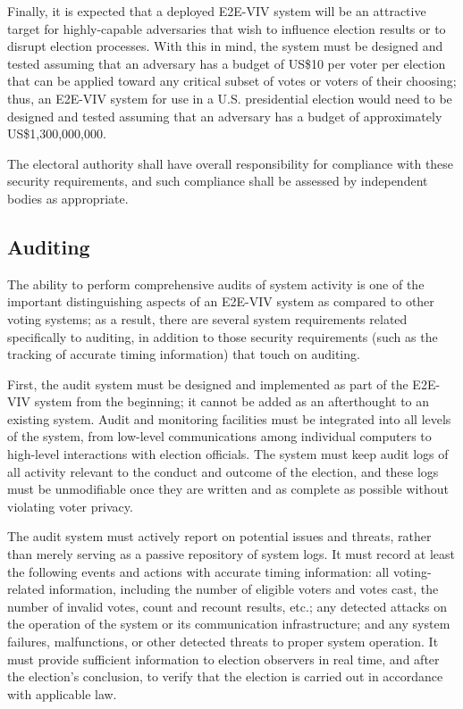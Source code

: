 Finally, it is expected that a deployed E2E-VIV system will be an
attractive target for highly-capable adversaries that wish to
influence election results or to disrupt election processes. With this
in mind, the system must be designed and tested assuming that an
adversary has a budget of US\$10 per voter per election that can be
applied toward any critical subset of votes or voters of their
choosing; thus, an E2E-VIV system for use in a U.S. presidential
election would need to be designed and tested assuming that an
adversary has a budget of approximately US\$1,300,000,000.

The electoral authority shall have overall responsibility for
compliance with these security requirements, and such compliance shall
be assessed by independent bodies as appropriate.

\subsection{Auditing}

The ability to perform comprehensive audits of system activity is one
of the important distinguishing aspects of an E2E-VIV system as
compared to other voting systems; as a result, there are several
system requirements related specifically to auditing, in addition to
those security requirements (such as the tracking of accurate timing
information) that touch on auditing.

First, the audit system must be designed and implemented as part of
the E2E-VIV system from the beginning; it cannot be added as an
afterthought to an existing system. Audit and monitoring facilities
must be integrated into all levels of the system, from low-level
communications among individual computers to high-level interactions
with election officials. The system must keep audit logs of all
activity relevant to the conduct and outcome of the election, and
these logs must be unmodifiable once they are written and as complete
as possible without violating voter privacy.

The audit system must actively report on potential issues and threats,
rather than merely serving as a passive repository of system logs. It
must record at least the following events and actions with accurate
timing information: all voting-related information, including the
number of eligible voters and votes cast, the number of invalid votes,
count and recount results, etc.; any detected attacks on the operation
of the system or its communication infrastructure; and any system
failures, malfunctions, or other detected threats to proper system
operation. It must provide sufficient information to election
observers in real time, and after the election's conclusion, to verify
that the election is carried out in accordance with applicable
law.

